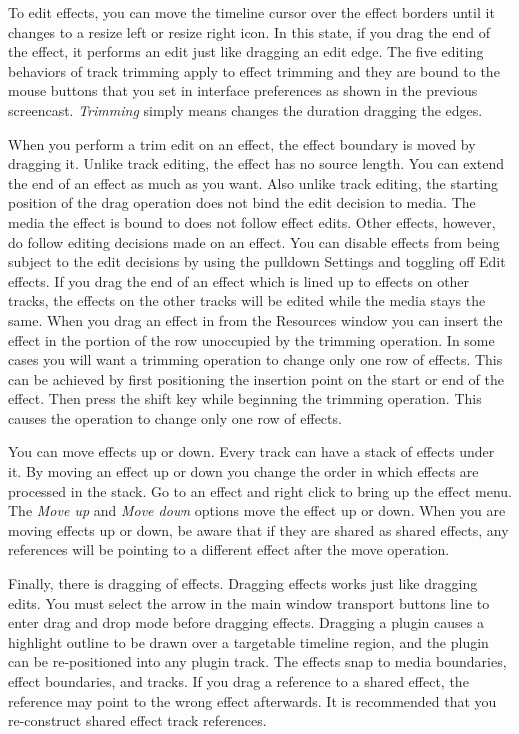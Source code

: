 To edit effects, you can move the timeline cursor over the effect borders until it changes to a resize left or resize right icon. In this state, if you drag the end of the effect, it performs an edit just like dragging an edit edge. The five editing behaviors of track trimming apply to effect trimming and they are bound to the mouse buttons that you set in interface preferences as shown in the previous screencast. \textit{Trimming} simply means changes the duration dragging the edges.

When you perform a trim edit on an effect, the effect boundary is moved by dragging it. Unlike track editing, the effect has no source length. You can extend the end of an effect as much as you want. Also unlike track editing, the starting position of the drag operation does not bind the edit decision to media. The media the effect is bound to does not follow effect edits. Other effects, however, do follow editing decisions made on an effect. You can disable effects from being subject to the edit decisions by using the pulldown Settings and toggling off Edit effects. If you drag the end of an effect which is lined up to effects on other tracks, the effects on the other tracks will be edited while the media stays the same. When you drag an effect in from the Resources window you can insert the effect in the portion of the row unoccupied by the trimming operation. In some cases you will want a trimming operation to change only one row of effects. This can be achieved by first positioning the insertion point on the start or end of the effect. Then press the shift key while beginning the trimming operation. This causes the operation to change only one row of effects.

You can move effects up or down. Every track can have a stack of effects under it. By moving an effect up or down you change the order in which effects are processed in the stack. Go to an effect and right click to bring up the effect menu. The \textit{Move up} and \textit{Move down} options move the effect up or down. When you are moving effects up or down, be aware that if they are shared as shared effects, any references will be pointing to a different effect after the move operation.

Finally, there is dragging of effects. Dragging effects works just like dragging edits. You must select the arrow in the main window transport buttons line to enter drag and drop mode before dragging effects. Dragging a plugin causes a highlight outline to be drawn over a targetable timeline region, and the plugin can be re-positioned into any plugin track.  The effects snap to media boundaries, effect boundaries, and tracks. If you drag a reference to a shared effect, the reference may point to the wrong effect afterwards.  It is recommended that you re-construct shared effect track references.

